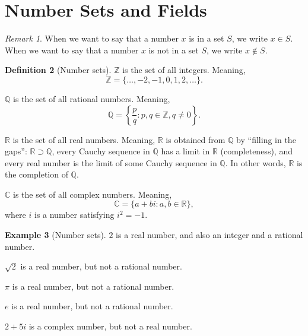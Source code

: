 \documentclass[11pt]{article}
\theoremstyle{definition}
\newtheorem{definition}{Definition}[section]
\newtheorem{example}[definition]{Example}
\theoremstyle{plain}
\theoremstyle{remark}
\newtheorem{remark}[definition]{Remark}
\begin{document}
\section{Number Sets and Fields}

\begin{remark}
    When we want to say that a number $x$ is in a set $S$, we write $x \in S$. When we want to say that a number $x$ is not in a set $S$, we write $x \notin S$.
\end{remark}

\begin{definition}[Number sets]
    $\mathbb{Z}$ is the set of all integers.
    Meaning, \[\mathbb{Z} = \{ \ldots, -2, -1, 0, 1, 2, \ldots \}.\]

    $\mathbb{Q}$ is the set of all rational numbers.
    Meaning, \[\mathbb{Q} = \left\{ \frac{p}{q} : p, q \in \mathbb{Z}, q \neq 0 \right\}.\]

    $\mathbb{R}$ is the set of all real numbers.
    Meaning, $\mathbb{R}$ is obtained from $\mathbb{Q}$ by ``filling in the gaps'': $\mathbb{R} \supset \mathbb{Q}$, every Cauchy sequence in $\mathbb{Q}$ has a limit in $\mathbb{R}$ (completeness), and every real number is the limit of some Cauchy sequence in $\mathbb{Q}$. In other words, $\mathbb{R}$ is the completion of $\mathbb{Q}$.

    $\mathbb{C}$ is the set of all complex numbers.
    Meaning, \[\mathbb{C} = \{ a + bi : a, b \in \mathbb{R} \},\] where $i$ is a number satisfying $i^2 = -1$.
\end{definition}

\begin{example}[Number sets]

    $2$ is a real number, and also an integer and a rational number.

    $\sqrt{2}$ is a real number, but not a rational number.

    $\pi$ is a real number, but not a rational number.

    $e$ is a real number, but not a rational number.

    $2 + 5i$ is a complex number, but not a real number.
\end{example}
\end{document}
